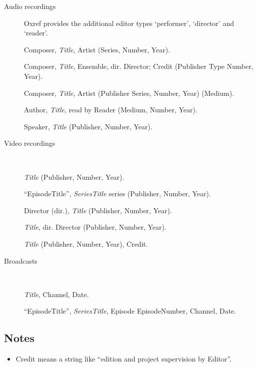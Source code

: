 \documentclass[extrafontsizes,11pt,a4paper,oneside]{memoir}
\newcommand*{\lit}[1]{\textsf{#1}}
\newcommand*{\code}[1]{`\textsf{#1}'}
\begin{document}
    \begin{description}
        \item[Audio recordings] Oxref provides the additional editor types \code{performer}, \code{director} and \code{reader}.
        \par Composer, \emph{Title}, Artist (Series, Number, Year).
        \\
        \par Composer, \emph{Title}, Ensemble, \lit{dir.} Director; Credit (Publisher Type Number, Year).
        \\
        \par Composer, \emph{Title}, Artist (Publisher Series, Number, Year) (Medium).
        \\
        \par Author, \emph{Title}, \lit{read by} Reader (Medium, Number, Year).
        \\
        \par Speaker, \emph{Title} (Publisher, Number, Year).
        \item[Video recordings]~
        \par \emph{Title} (Publisher, Number, Year).
        \par \enquote{EpisodeTitle}, \emph{SeriesTitle} \lit{series} (Publisher, Number, Year).
        \par Director (\lit{dir.}), \emph{Title} (Publisher, Number, Year).
        \par \emph{Title}, \lit{dir.} Director (Publisher, Number, Year).
        \par \emph{Title} (Publisher, Number, Year), Credit.
        \item[Broadcasts]~
        \par \emph{Title}, Channel, Date.
        \par \enquote{EpisodeTitle}, \emph{SeriesTitle}, \lit{Episode} EpisodeNumber, Channel, Date.
    \end{description}
    
    \subsection{Notes}
    \begin{itemize}
        \item Credit means a string like \enquote{edition and project supervision by Editor}.
    \end{itemize}
    
\end{document}
